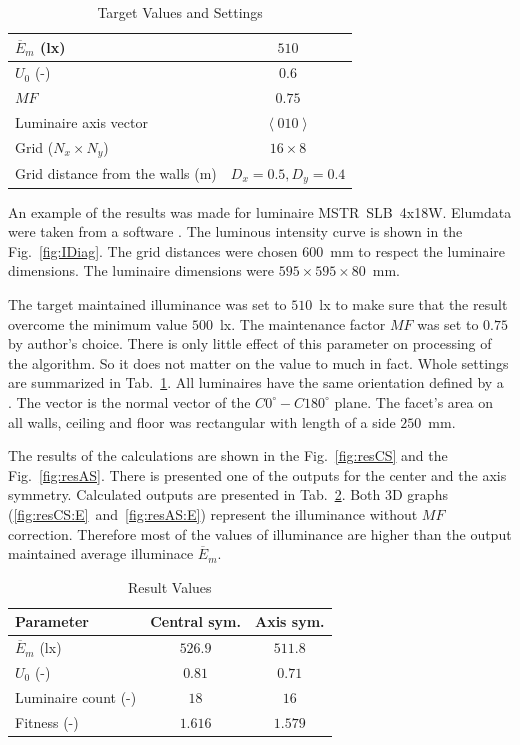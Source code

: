 \begin{table}[htb]
	\renewcommand{\arraystretch}{1.3}
	\caption{Target Values and Settings}
 	\label{tab:trgVal}
	\centering
  \begin{tabular}{| l | c |}
    \hline
    $\overline{E}_{m}$ (lx) & $510$ \\
    \hline
    $U_{0}$ (-) & $0.6$ \\
    \hline
		$MF$ & $0.75$ \\
    \hline
		Luminaire axis vector & $\left\langle 010\right\rangle$ \\
    \hline
		Grid ($N_x \times N_y$) & $16 \times 8$ \\
    \hline
		Grid distance from the walls (m) & $D_x=0.5, D_y=0.4$ \\
    \hline
  \end{tabular}
\end{table}

An example of the results was made for luminaire MSTR~SLB~4x18W. Elumdata were taken from a software . The luminous intensity curve is shown in the Fig.~\ref{fig:IDiag}. The grid distances were chosen $600$~mm to respect the luminaire dimensions. The luminaire dimensions were $595\times 595\times 80$~mm.

The target maintained illuminance was set to $510$~lx to make sure that the result overcome the minimum value $500$~lx. The maintenance factor $MF$ was set  to $0.75$ by author's choice. There is only little effect of this parameter on processing of the algorithm. So it does not matter on the value to much in fact. Whole settings are summarized in Tab.~\ref{tab:trgVal}. All luminaires have the same orientation defined by a . The vector is the normal vector of the $C0^\circ-C180^\circ$ plane. The facet's area on all walls, ceiling and floor was rectangular with length of a side $250$~mm.

The results of the calculations are shown in the Fig.~\ref{fig:resCS} and the Fig.~\ref{fig:resAS}. There is presented one of the outputs for the center and the axis symmetry.  Calculated outputs are presented in Tab.~\ref{tab:resVal}. Both 3D graphs (\ref{fig:resCS:E}~and~\ref{fig:resAS:E}) represent the illuminance without $MF$ correction. Therefore most of the values of illuminance are higher than the output maintained average illuminace $\overline{E}_{m}$.

\begin{table}[htb]
	\renewcommand{\arraystretch}{1.3}
	\caption{Result Values}
 	\label{tab:resVal}
	\centering
  \begin{tabular}{| l | c | c |}
	  \hline
	  \textbf{Parameter} & \textbf{Central sym.} & \textbf{Axis sym.}\\
    \hline
    $\overline{E}_{m}$ (lx) & $526.9$ & $511.8$ \\
    \hline
    $U_{0}$ (-) & $0.81$ & $0.71$ \\
    \hline
		Luminaire count (-) & $18$ & $16$ \\
    \hline
		Fitness (-) & $1.616$ & $1.579$ \\
    \hline
  \end{tabular}
\end{table}

